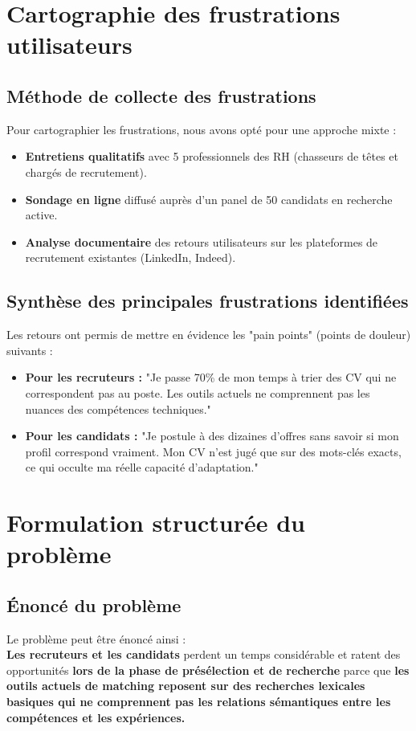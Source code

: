\documentclass[12pt,a4paper]{report}
\begin{document}
\section{Cartographie des frustrations utilisateurs}

\subsection{Méthode de collecte des frustrations}
Pour cartographier les frustrations, nous avons opté pour une approche mixte :
\begin{itemize}
    \item \textbf{Entretiens qualitatifs} avec 5 professionnels des RH (chasseurs de têtes et chargés de recrutement).
    \item \textbf{Sondage en ligne} diffusé auprès d'un panel de 50 candidats en recherche active.
    \item \textbf{Analyse documentaire} des retours utilisateurs sur les plateformes de recrutement existantes (LinkedIn, Indeed).
\end{itemize}

\subsection{Synthèse des principales frustrations identifiées}
Les retours ont permis de mettre en évidence les "pain points" (points de douleur) suivants :
\begin{itemize}
    \item \textbf{Pour les recruteurs :} "Je passe 70\% de mon temps à trier des CV qui ne correspondent pas au poste. Les outils actuels ne comprennent pas les nuances des compétences techniques."
    \item \textbf{Pour les candidats :} "Je postule à des dizaines d'offres sans savoir si mon profil correspond vraiment. Mon CV n'est jugé que sur des mots-clés exacts, ce qui occulte ma réelle capacité d'adaptation."
\end{itemize}

\section{Formulation structurée du problème}

\subsection{Énoncé du problème}
Le problème peut être énoncé ainsi : \\
\textbf{Les recruteurs et les candidats} perdent un temps considérable et ratent des opportunités \textbf{lors de la phase de présélection et de recherche} parce que \textbf{les outils actuels de matching reposent sur des recherches lexicales basiques qui ne comprennent pas les relations sémantiques entre les compétences et les expériences.}
\end{document}
